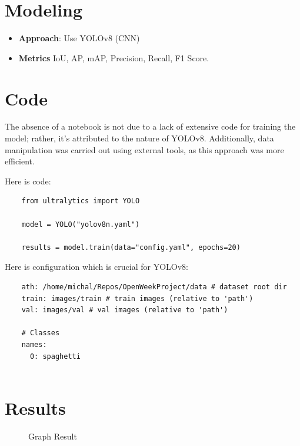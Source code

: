 \documentclass[12pt,a4paper]{article}
\begin{document}
\section{Modeling}
\begin{itemize}
    \item \textbf{Approach}: Use YOLOv8 (CNN)
    \item \textbf{Metrics} IoU, AP, mAP, Precision, Recall, F1 Score.
\end{itemize}


\section{Code}
The absence of a notebook is not due to a lack of extensive code for training the model; rather, it's attributed to the nature of YOLOv8. Additionally, data manipulation was carried out using external tools, as this approach was more efficient.

Here is code: 
\begin{verbatim}
    from ultralytics import YOLO

    model = YOLO("yolov8n.yaml")  
    
    results = model.train(data="config.yaml", epochs=20) 
\end{verbatim}

\newpage

Here is configuration which is crucial for YOLOv8: 

\begin{verbatim}
    ath: /home/michal/Repos/OpenWeekProject/data # dataset root dir
    train: images/train # train images (relative to 'path')
    val: images/val # val images (relative to 'path')
    
    # Classes
    names:
      0: spaghetti
    
\end{verbatim}


\section{Results}


\begin{figure}[h]
    \centering
    \caption{Graph Result}
    \label{fig:grpahresult}
\end{figure}
\end{document}
